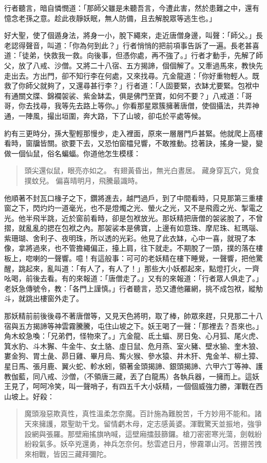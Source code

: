 行者聽言，暗自憐憫道：「那師父雖是未聽吾言，今遭此害，然於患難之中，還有憶念老孫之意。趁此夜靜妖眠，無人防備，且去解脫眾等逃生也。」

好大聖，使了個遁身法，將身一小，脫下繩來，走近唐僧身邊，叫聲：「師父。」長老認得聲音，叫道：「你為何到此？」行者悄悄的把前項事告訴了一遍。長老甚喜道：「徒弟，快救我一救。向後事，但憑你處，再不強了。」行者才動手，先解了師父，放了八戒、沙僧。又將二十八宿、五方揭諦，個個解了。又牽過馬來，教快先走出去。方出門，卻不知行李在何處，又來找尋。亢金龍道：「你好重物輕人。既救了你師父就夠了，又還尋甚行李？」行者道：「人固要緊，衣缽尤要緊。包袱中有通關文牒、錦襴袈裟、紫金缽盂，俱是佛門至寶，如何不要？」八戒道：「哥哥，你去找尋，我等先去路上等你。」你看那星眾簇擁著唐僧，使個攝法，共弄神通，一陣風，撮出垣圍，奔大路，下了山坡，卻屯於平處等候。

約有三更時分，孫大聖輕那慢步，走入裡面，原來一層層門戶甚緊。他就爬上高樓看時，窗牖皆關。欲要下去，又恐怕窗櫺兒響，不敢推動。捻著訣，搖身一變，變做一個仙鼠，俗名蝙蝠。你道他怎生模樣：
\begin{quote}
頭尖還似鼠，眼亮亦如之。
有翅黃昏出，無光白晝居。
藏身穿瓦穴，覓食撲蚊兒。
偏喜晴明月，飛騰最識時。
\end{quote}

他順著不封瓦口椽子之下，鑽將進去，越門過戶，到了中間看時，只見那第三重樓窗之下，閃灼灼一道毫光，也不是燈燭之光、螢火之光，又不是飛霞之光、掣電之光。他半飛半跳，近於窗前看時，卻是包袱放光。那妖精把唐僧的袈裟脫了，不曾摺，就亂亂的揌在包袱之內。那袈裟本是佛寶，上邊有如意珠、摩尼珠、紅瑪瑙、紫珊瑚、舍利子、夜明珠，所以透的光彩。他見了此衣缽，心中一喜，就現了本像，拿將過來，也不管擔繩偏正，擡上肩，往下就走。不期脫了一頭，撲的落在樓板上，唿喇的一聲響。噫！有這般事：可可的老妖精在樓下睡覺，一聲響，把他驚醒，跳起來，亂叫道：「有人了，有人了！」那些大小妖都起來，點燈打火，一齊吆喝，前後去看。有的來報道：「唐僧走了。」又有的來報道：「行者眾人俱走了。」老妖急傳號令，教：「各門上謹慎。」行者聽言，恐又遭他羅網，挑不成包袱，縱觔斗，就跳出樓窗外走了。

那妖精前前後後尋不著唐僧等，又見天色將明，取了棒，帥眾來趕，只見那二十八宿與五方揭諦等神雲霧騰騰，屯住山坡之下。妖王喝了一聲：「那裡去？吾來也。」角木蛟急喚：「兄弟們，怪物來了。」亢金龍、氐土蝠、房日兔、心月狐、尾火虎、箕水豹、斗木獬、牛金牛、女土貉、虛日鼠、危月燕、室火豬、壁水㺄、奎木狼、婁金狗、胃土彘、昴日雞、畢月烏、觜火猴、參水猿、井木犴、鬼金羊、柳土獐、星日馬、張月鹿、翼火蛇、軫水蚓，領著金頭揭諦、銀頭揭諦、六甲六丁等神、護教伽藍，同八戒、沙僧，（不領唐三藏，丟了白龍馬）各執兵器，一擁而上。這妖王見了，呵呵冷笑，叫一聲哨子，有四五千大小妖精，一個個威強力勝，渾戰在西山坡上。好殺：
\begin{quote}
魔頭潑惡欺真性，真性溫柔怎奈魔。百計施為難脫苦，千方妙用不能和。諸天來擁護，眾聖助干戈。留情虧木母，定志感黃婆。渾戰驚天並振地，強爭設網與張羅。那壁廂搖旗吶喊，這壁廂擂鼓篩鑼。槍刀密密寒光蕩，劍戟紛紛殺氣多。妖卒兇還勇，神兵怎奈何。愁雲遮日月，慘霧罩山河。苦掤苦拽來相戰，皆因三藏拜彌陀。
\end{quote}


